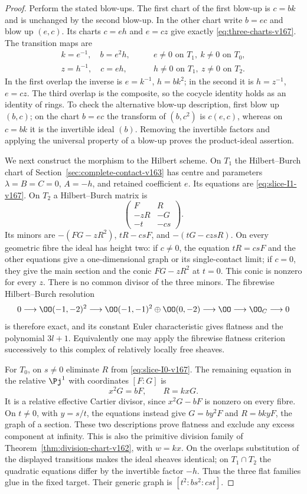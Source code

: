 \begin{proof}
Perform the stated blow-ups. The first chart of the first blow-up
is $c=bk$ and is unchanged by the second blow-up. In the other
chart write $b=ec$ and blow up $(e,c)$. Its charts $c=eh$ and
$e=cz$ give exactly \eqref{eq:three-charts-v167}. The transition
maps are
\begin{align*}
 k=e^{-1},\quad b=e^2h,
 &\qquad e\ne0 \text{ on }T_1,\ k\ne0\text{ on }T_0,\\
 z=h^{-1},\quad c=eh,
 &\qquad h\ne0 \text{ on }T_1,\ z\ne0\text{ on }T_2.
\end{align*}
In the first overlap the inverse is $e=k^{-1}$, $h=bk^2$;
in the second it is $h=z^{-1}$, $e=cz$. The third overlap is
the composite, so the cocycle identity holds as an identity of
rings. To check the alternative blow-up description, first blow
up $(b,c)$; on the chart $b=ec$ the transform of $(b,c^2)$ is
$c(e,c)$, whereas on $c=bk$ it is the invertible ideal $(b)$.
Removing the invertible factors and applying the universal
property of a blow-up proves the product-ideal assertion.

We next construct the morphism to the Hilbert scheme. On $T_1$
the Hilbert--Burch chart of
Section~\ref{sec:complete-contact-v163} has centre and parameters
$\lambda=B=C=0$, $A=-h$, and retained coefficient $e$.
Its equations are \eqref{eq:slice-I1-v167}. On $T_2$ a
Hilbert--Burch matrix is
\[
 \begin{pmatrix} F&R\\-zR&-G\\-t&-cs\end{pmatrix}.
\]
Its minors are $-(FG-zR^2)$, $tR-csF$, and
$-(tG-czsR)$. On every geometric fibre the ideal has height two:
if $c\ne0$, the equation $tR=csF$ and the other equations give a
one-dimensional graph or its single-contact limit; if $c=0$,
they give the main section and the conic $FG-zR^2$ at $t=0$.
This conic is nonzero for every $z$. There is no common divisor
of the three minors. The fibrewise Hilbert--Burch resolution
\[
 0\longrightarrow\OO(-1,-2)^2\longrightarrow
 \OO(-1,-1)^2\oplus\OO(0,-2)\longrightarrow\OO
 \longrightarrow\OO_C\longrightarrow0
\]
is therefore exact, and its constant Euler characteristic gives
flatness and the polynomial $3l+1$. Equivalently one may apply
the fibrewise flatness criterion successively to this complex of
relatively locally free sheaves.

For $T_0$, on $s\ne0$ eliminate $R$ from
\eqref{eq:slice-I0-v167}. The remaining equation in the relative
$\Pj^1$ with coordinates $[F:G]$ is
\[
                     x^2G=bF,\qquad R=kxG.
\]
It is a relative effective Cartier divisor, since $x^2G-bF$ is
nonzero on every fibre. On $t\ne0$, with $y=s/t$, the equations
instead give $G=by^2F$ and $R=bkyF$, the graph of a section.
These two descriptions prove flatness and exclude any excess
component at infinity. This is also the primitive division family
of Theorem~\ref{thm:division-chart-v162}, with $w=kx$.
On the overlaps substitution of the displayed transitions makes
the ideal sheaves identical; on $T_1\cap T_2$ the quadratic
equations differ by the invertible factor $-h$. Thus the three
flat families glue in the fixed target. Their generic graph is
$[t^2:bs^2:cst]$.


\end{proof}
